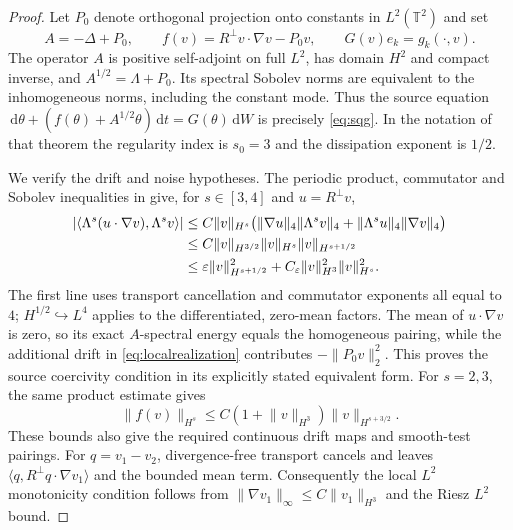 \documentclass[11pt]{amsart}
\theoremstyle{remark}
\numberwithin{equation}{section}
\newcommand{\T}{\mathbb T}
\newcommand{\dd}{\,\mathrm d}
\newcommand{\norm}[1]{\lVert#1\rVert}
\begin{document}
\begin{proof}
Let $P_0$ denote orthogonal projection onto constants in $L^2(\T^2)$ and set
\begin{equation}\label{eq:localrealization}
 A=-\Delta+P_0,\qquad
 f(v)=R^\perp v\cdot\nabla v-P_0v,\qquad
 G(v)e_k=g_k(\cdot,v).
\end{equation}
The operator $A$ is positive self-adjoint on full $L^2$, has domain $H^2$
and compact inverse, and $A^{1/2}=\Lambda+P_0$. Its spectral Sobolev norms
are equivalent to the inhomogeneous norms, including the constant mode.
Thus the source equation $\dd\theta+(f(\theta)+A^{1/2}\theta)\dd t
=G(\theta)\dd W$ is precisely \eqref{eq:sqg}. In the notation of that
theorem the regularity index is $s_0=3$ and the dissipation exponent is $1/2$.

We verify the drift and noise hypotheses. The periodic product, commutator and
Sobolev inequalities in \cite[Lemmas 5.1--5.3 and Section 5.2]{RZZ} give, for
$s\in[3,4]$ and $u=R^\perp v$,
\begin{align}
 |\langle\Lambda^s(u\cdot\nabla v),\Lambda^sv\rangle|
 &\leq C\norm{v}_{H^s}
 \big(\norm{\nabla u}_4\norm{\Lambda^sv}_4
       +\norm{\Lambda^su}_4\norm{\nabla v}_4\big)\notag\\
 &\leq C\norm{v}_{H^{3/2}}\norm{v}_{H^s}\norm{v}_{H^{s+1/2}}\notag\\
 &\leq\varepsilon\norm{v}_{H^{s+1/2}}^2
   +C_\varepsilon\norm{v}_{H^3}^2\norm{v}_{H^s}^2.
 \label{eq:localcoercive}
\end{align}
The first line uses transport cancellation and commutator exponents all equal
to $4$; $H^{1/2}\hookrightarrow L^4$ applies to the differentiated,
zero-mean factors. The mean of $u\cdot\nabla v$ is zero, so its exact
$A$-spectral energy equals the homogeneous pairing, while the additional drift
in \eqref{eq:localrealization} contributes $-\norm{P_0v}_2^2$.
This proves the source coercivity condition in its explicitly stated equivalent
form. For $s=2,3$, the same product estimate gives
\[
 \norm{f(v)}_{H^s}\leq C(1+\norm{v}_{H^3})\norm{v}_{H^{s+3/2}}.
\]
These bounds also give the required continuous drift maps and smooth-test
pairings. For $q=v_1-v_2$, divergence-free transport cancels and leaves
$\langle q,R^\perp q\cdot\nabla v_1\rangle$ and the bounded mean term.
Consequently the local $L^2$ monotonicity condition follows from
$\norm{\nabla v_1}_\infty\leq C\norm{v_1}_{H^3}$ and the Riesz $L^2$ bound.


\end{proof}
\end{document}
